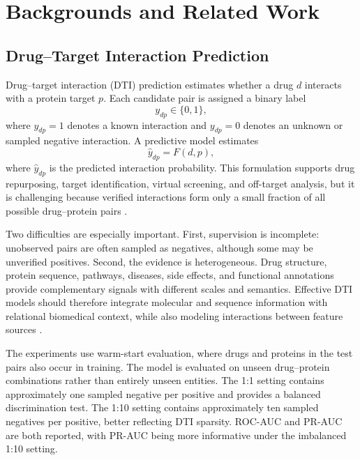 \section{Backgrounds and Related Work}
\label{sec:related_work}

\subsection{Drug--Target Interaction Prediction}

Drug--target interaction (DTI) prediction estimates whether a drug $d$ interacts with a protein target $p$. Each candidate pair is assigned a binary label
\begin{equation}
    y_{dp} \in \{0,1\},
\end{equation}
where $y_{dp}=1$ denotes a known interaction and $y_{dp}=0$ denotes an unknown or sampled negative interaction. A predictive model estimates
\begin{equation}
    \hat{y}_{dp}=F(d,p),
\end{equation}
where $\hat{y}_{dp}$ is the predicted interaction probability. This formulation supports drug repurposing, target identification, virtual screening, and off-target analysis, but it is challenging because verified interactions form only a small fraction of all possible drug--protein pairs \cite{ezzat2019computational,ozturk2018deepdta}.

Two difficulties are especially important. First, supervision is incomplete: unobserved pairs are often sampled as negatives, although some may be unverified positives. Second, the evidence is heterogeneous. Drug structure, protein sequence, pathways, diseases, side effects, and functional annotations provide complementary signals with different scales and semantics. Effective DTI models should therefore integrate molecular and sequence information with relational biomedical context, while also modeling interactions between feature sources \cite{nguyen2021graphdta,luo2017network}.

The experiments use warm-start evaluation, where drugs and proteins in the test pairs also occur in training. The model is evaluated on unseen drug--protein combinations rather than entirely unseen entities. The 1:1 setting contains approximately one sampled negative per positive and provides a balanced discrimination test. The 1:10 setting contains approximately ten sampled negatives per positive, better reflecting DTI sparsity. ROC-AUC and PR-AUC are both reported, with PR-AUC being more informative under the imbalanced 1:10 setting.


